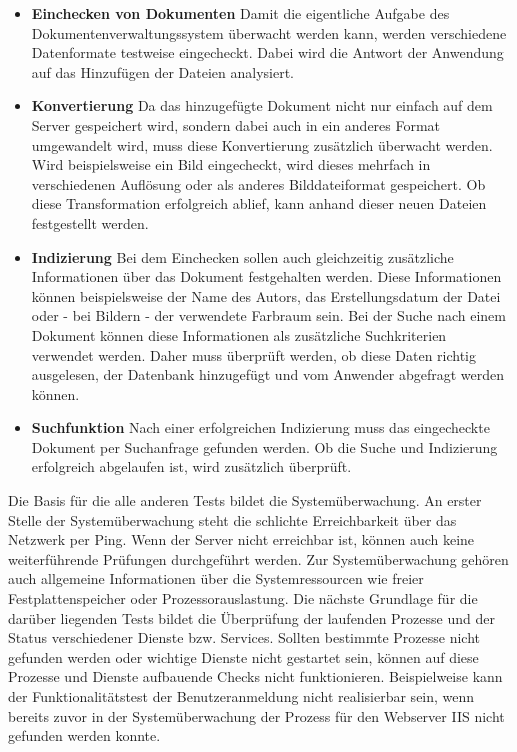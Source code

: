 \begin{itemize}

\item \textbf{Einchecken von Dokumenten} Damit die eigentliche Aufgabe des Dokumentenverwaltungssystem überwacht werden kann, werden verschiedene Datenformate testweise eingecheckt. 
Dabei wird die Antwort der Anwendung auf das Hinzufügen der Dateien analysiert.

\item \textbf{Konvertierung} Da das hinzugefügte Dokument nicht nur einfach auf dem Server gespeichert wird, sondern dabei auch in ein anderes Format umgewandelt wird, muss diese Konvertierung zusätzlich überwacht werden. 
Wird beispielsweise ein Bild eingecheckt, wird dieses mehrfach in verschiedenen Auflösung oder als anderes Bilddateiformat gespeichert. 
Ob diese Transformation erfolgreich ablief, kann anhand dieser neuen Dateien festgestellt werden.

\item \textbf{Indizierung} Bei dem Einchecken sollen auch gleichzeitig zusätzliche Informationen über das Dokument festgehalten werden. 
Diese Informationen können beispielsweise der Name des Autors, das Erstellungsdatum der Datei oder - bei Bildern - der verwendete Farbraum sein. 
Bei der Suche nach einem Dokument können diese Informationen als zusätzliche Suchkriterien verwendet werden.
Daher muss überprüft werden, ob diese Daten richtig ausgelesen, der Datenbank hinzugefügt und vom Anwender abgefragt werden können. %

\item \textbf{Suchfunktion} Nach einer erfolgreichen Indizierung muss das eingecheckte Dokument per Suchanfrage gefunden werden.
Ob die Suche und Indizierung erfolgreich abgelaufen ist, wird zusätzlich überprüft. 
\end{itemize}
Die Basis für die alle anderen Tests bildet die Systemüberwachung.
An erster Stelle der Systemüberwachung steht die schlichte Erreichbarkeit über das Netzwerk per Ping.
Wenn der Server nicht erreichbar ist, können auch keine weiterführende Prüfungen durchgeführt werden.
Zur Systemüberwachung gehören auch allgemeine Informationen über die Systemressourcen wie freier Festplattenspeicher oder Prozessorauslastung.
Die nächste Grundlage für die darüber liegenden Tests bildet die Überprüfung der laufenden Prozesse und der Status verschiedener Dienste bzw. Services.
Sollten bestimmte Prozesse nicht gefunden werden oder wichtige Dienste nicht gestartet sein, können auf diese Prozesse und Dienste aufbauende Checks nicht funktionieren.
Beispielweise kann der Funktionalitätstest der Benutzeranmeldung nicht realisierbar sein, wenn bereits zuvor in der Systemüberwachung der Prozess für den Webserver \gls{IIS} nicht gefunden werden konnte.
\newpage

